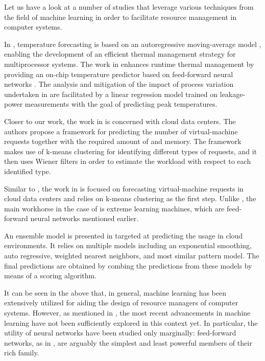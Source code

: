 Let us have a look at a number of studies that leverage various techniques from
the field of machine learning in order to facilitate resource management in
computer systems.

In \cite{coskun2008}, temperature forecasting is based on an autoregressive
moving-average model \cite{hastie2013}, enabling the development of an efficient
thermal management strategy for multiprocessor systems. The work in
\cite{kumar2010} enhances runtime thermal management by providing an on-chip
temperature predictor based on feed-forward neural networks \cite{hastie2013}.
The analysis and mitigation of the impact of process variation undertaken in
\cite{juan2014} are facilitated by a linear regression model \cite{hastie2013}
trained on leakage-power measurements with the goal of predicting peak
temperatures.

Closer to our work, the work in \cite{dabbagh2015} is concerned with cloud data
centers. The authors propose a framework for predicting the number of
virtual-machine requests together with the required amount of  and
memory. The framework makes use of k-means clustering \cite{hastie2013} for
identifying different types of requests, and it then uses Wiener filters in
order to estimate the workload with respect to each identified type.

Similar to \cite{dabbagh2015}, the work in \cite{ismaeel2015} is focused on
forecasting virtual-machine requests in cloud data centers and relies on k-means
clustering as the first step. Unlike \cite{dabbagh2015}, the main workhorse in
the case of \cite{ismaeel2015} is extreme learning machines, which are
feed-forward neural networks mentioned earlier.

An ensemble model \cite{hastie2013} is presented in \cite{cao2014} targeted at
predicting the  usage in cloud environments. It relies on multiple
models including an exponential smoothing, auto regressive, weighted nearest
neighbors, and most similar pattern model. The final predictions are obtained by
combing the predictions from these models by means of a scoring algorithm.

It can be seen in the above that, in general, machine learning has been
extensively utilized for aiding the design of resource managers of computer
systems. However, as mentioned in , the most recent
advancements in machine learning have not been sufficiently explored in this
context yet. In particular, the utility of neural networks have been studied
only marginally: feed-forward networks, as in \cite{kumar2010, ismaeel2015}, are
arguably the simplest and least powerful members of their rich family.

